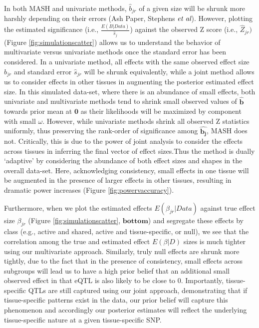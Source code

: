 In both MASH and univariate methods, $\hat{b}_{jr}$ of a given size will be shrunk more harshly depending on their errors (Ash Paper, Stephens $\emph{et al}$). 
However, plotting the estimated significance (i.e., $\frac{E(B|Data)}{\hat{s}_{j}}$) against the observed Z score (i.e., $\hat{Z}_{jr})$ (Figure \ref{fig:simulationscatter}) allows us to understand the behavior of multivariate versus univariate methods once the standard error has been considered. In a univariate method, all effects with the same observed effect size $\hat{b}_{jr}$ and standard error $\hat{s}_{jr}$ will be shrunk equivalently, while a joint method allows us to consider effects in other tissues in augmenting the posterior estimated effect size.
In this simulated data-set, where there is an abundance of small effects, both univariate and multivariate methods tend to shrink small observed values of $\hat{\bm{b}}$ towards prior mean at $\bm{0}$ as their likelihoods will be maximized by component with small $\omega$. However, while univariate methods shrink all observed Z statistics uniformly, thus preserving the rank-order of significance among $\hat{\bm{b_{j}}}$, MASH does not. Critically, this is due to the power of joint analysis to consider the effects across tissues in inferring the final vector of effect sizes.Thus the method is dually `adaptive' by considering the abundance of both effect sizes and shapes in the overall data-set.  Here, acknowledging consistency, small effects in one tissue will be augmented in the presence of larger effects in other tissues, resulting in dramatic power increases (Figure \ref{fig:powervaccuracy}).

Furthermore, when we plot the estimated effects $E(\beta_{jr}|Data)$ against true effect size $\beta_{jr}$ (Figure \ref{fig:simulationscatter}, $\textbf{bottom}$) and segregate these effects by class  (e.g., active and shared, active and tissue-specific, or null), we see that the correlation among the true and estimated effect $E(\beta|D)$ sizes is much tighter using our multivariate approach. Similarly, truly null effects are shrunk more tightly, due to the fact that in the presence of consistency, small effects across subgroups will lead us to have a high prior belief that an additional small observed effect in that eQTL is also likely to be close to 0. Importantly, tissue-specific QTLs are still captured using our joint approach, demonstrating that if tissue-specific patterns exist in the data, our prior belief will capture this phenomenon and accordingly our posterior estimates will reflect the underlying tissue-specific nature at a given tissue-specific SNP.

